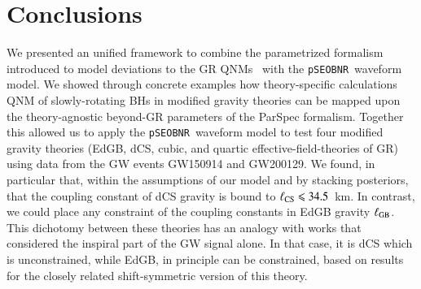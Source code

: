 \documentclass[twocolumn,
               prd,
               aps,
               superscriptaddress,
               tightenlines,
               nofootinbib,
               eqsecnum,
               amsfonts,
               amsmath,
               longbibliography]{revtex4-1}
\newcommand{\pSEOB}{\texttt{pSEOBNR}}
\newcommand{\hs}[1]{{\textcolor{blue}{{[HS: #1]}} }}
\begin{document}
%

\section{Conclusions}
\label{sec:conclusions}


We presented an unified framework to combine the parametrized formalism introduced
to model deviations to the GR QNMs~\cite{Maselli:2019mjd} with the \pSEOB~waveform model.
%
We showed through concrete examples how theory-specific calculations QNM of
slowly-rotating BHs in modified gravity theories can be mapped upon the
theory-agnostic beyond-GR parameters of the ParSpec formalism.
%
Together this allowed us to apply the \pSEOB~waveform model to test four
modified gravity theories (EdGB, dCS, cubic, and quartic
effective-field-theories of GR) using data from the GW events GW150914 and GW200129.
%
We found, in particular that, within the assumptions of our model and by
stacking posteriors, that the coupling constant of dCS gravity is bound to
$\ell_{\rm CS} \leqslant 34.5$~km.
%
In contrast, we could place any constraint of the coupling constants in EdGB gravity $\ell_{\rm GB}$.
%
This dichotomy between these theories has an analogy with works that considered
the inspiral part of the GW signal alone.
%
In that case, it is dCS which is unconstrained, while EdGB, in principle can be
constrained, based on results for the closely related shift-symmetric version
of this theory.
\end{document}
